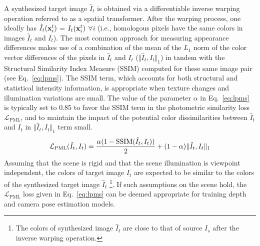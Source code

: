 \documentclass[a4paper,fleqn]{cas-dc}
\begin{document}
%
A synthesized target image $\hat{I}_{t}$ is obtained via a differentiable inverse warping operation referred to as a spatial transformer. After the warping process, one ideally has  $\hat{I}_{t}({\bf x}_i^t)$ = $I_{t}({\bf x}_i^t)$ $\forall i$ (i.e., homologous pixels have the same colors in images $\hat{I}_{t}$ and $I_{t}$). 
% 
The most common approach for measuring appearance differences makes use of a combination of  the mean of the $L_1$ norm of the color vector differences of the pixels in $\hat{I}{_t}$ and $I{_t}$  ($\Vert\hat{I}_{t},I_t\Vert_1$) in tandem with the Structural Similarity Index Measure (SSIM) computed for these same image pair (see Eq.~\eqref{eq:lpms}). The SSIM term, which accounts for both structural and statistical intensity information, is appropriate when texture changes and illumination variations are small. The value of the parameter $\alpha$ in Eq.~\eqref{eq:lpms} is typically set to 0.85 to favor the SSIM term 
in the photometric similarity loss $\mathcal{L}_\textrm{PML}$, and to maintain the impact of the potential color dissimilarities between $\hat{I}_t$ and $I_t$ in   $\Vert\hat{I}_{t},I_t\Vert_1$ term small. 
%
\begin{equation} \label{eq:lpms}
\mathcal{L}_\textrm{PML}(\hat{I}_{t},I_t) = \frac{\alpha (1-\textrm{SSIM}(\hat{I}_{t},I_t))}{2} \\ 
+ (1 - \alpha) \Vert\hat{I}_{t},I_t\Vert_1
\end{equation}
%
Assuming that the scene is rigid and that the scene illumination is viewpoint independent, the colors of target image $I_{t}$ are expected to be similar to the colors of the synthesized target image $\hat{I}_{t}$ \footnote{The colors of synthesized image $\hat{I}_{t}$ are close to that of source $I_s$ after the inverse warping operation.}. If such assumptions on the scene hold, the $\mathcal{L}_\textrm{PML}$ loss given in Eq.~\eqref{eq:lpms} can be deemed appropriate for training depth and camera pose estimation models.
\end{document}
